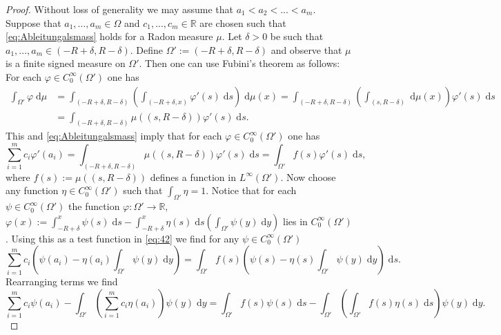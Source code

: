 \documentclass[twoside,11pt]{article}
\theoremstyle{definition}
\begin{document}
\begin{proof}Without loss of generality we may assume that $a_1<a_2<...<a_m$. 
    Suppose that $a_1,...,a_m \in \Omega$ and $c_1,...,c_m\in \mathbb{R}$ are chosen such that \eqref{eq:Ableitungalsmass} holds for a Radon measure $\mu$. Let $\delta > 0$ be such that  $a_1,...,a_m \in (-R+ \delta, R-\delta)$. Define $\Omega' := (-R + \delta ,R- \delta)$ and observe that $\mu$ is a finite signed measure on $\Omega'$. Then one can use Fubini's theorem as follows: For each $\varphi \in C_0^\infty(\Omega')$ one has 
    \begin{align*}
        \int_{\Omega'} \varphi \; \mathrm{d}\mu & = \int_{(-R+\delta,R-\delta)} \left( \int_{(-R+\delta,x)} \varphi'(s) \; \mathrm{d}s \right) \; \mathrm{d}\mu(x)  = \int_{(-R+\delta,R-\delta)} \left( \int_{(s,R-\delta)}  \; \mathrm{d}\mu(x) \right) \varphi'(s) \; \mathrm{d}s
         \\ & = \int_{(-R+\delta,R-\delta)} \mu((s,R-\delta)) \varphi'(s) \; \mathrm{d}s.
    \end{align*}
    This and \eqref{eq:Ableitungalsmass} imply that for each $\varphi \in C_0^\infty(\Omega')$ one has 
    \begin{equation}\label{eq:42}
        \sum_{i = 1}^m c_i \varphi'(a_i) = \int_{(-R+\delta,R-\delta)} \mu((s,R-\delta)) \varphi'(s) \; \mathrm{d}s = \int_{\Omega'} f(s) \varphi'(s) \; \mathrm{d}s,
    \end{equation}
    where $f(s) := \mu((s,R-\delta))$ defines a function in $L^\infty(\Omega').$
    Now choose any function $\eta \in C_0^\infty(\Omega')$ such that $\int_{\Omega'} \eta = 1$. Notice that for each $\psi \in C_0^\infty(\Omega')$ the function $\varphi: \Omega' \rightarrow \mathbb{R},$  $\varphi(x) := \int_{-R+\delta}^x \psi(s) \; \mathrm{d}s - \int_{-R + \delta}^x  \eta(s) \; \mathrm{d}s \left( \int_{\Omega'} \psi(y) \; \mathrm{d}y \right) $ lies in $C_0^\infty(\Omega')$. Using this as a test  function in \eqref{eq:42} we find for any $\psi \in C_0^\infty(\Omega')$
    \begin{equation*}
        \sum_{i = 1}^m c_i \left( \psi(a_i) - \eta(a_i) \int_{\Omega'} \psi(y) \; \mathrm{d}y \right) = \int_{\Omega'} f(s) \left( \psi(s) - \eta(s) \int_{\Omega'} \psi(y) \; \mathrm{d}y \right) \; \mathrm{d}s. 
    \end{equation*}
    Rearranging terms we find
    \begin{equation*}
        \sum_{i = 1}^m c_i \psi(a_i) - \int_{\Omega'} \left( \sum_{i = 1}^m c_i \eta(a_i) \right) \psi(y)  \; \mathrm{d}y = \int_{\Omega'} f(s) \psi(s) \; \mathrm{d}s - \int_{\Omega'} \left(  \int_{\Omega'} f(s) \eta(s) \; \mathrm{d}s \right) \psi(y) \; \mathrm{d}y. 

\end{equation*}
\end{proof}
\end{document}
